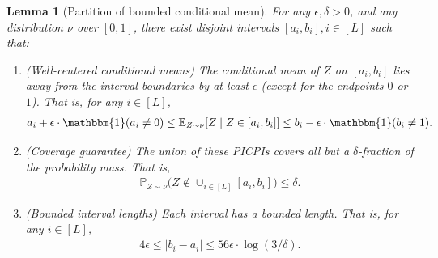\documentclass[11pt]{article}
\theoremstyle{statplain}
\newtheorem{lemma}[theorem]{Lemma}
\theoremstyle{statdefinition}
\newenvironment{proofsketch}
  {\begin{proof}[Proof sketch]\renewcommand{\qedsymbol}{}}
  {\end{proof}}
\newcommand{\E}{\mathbb{E}}
\newcommand{\PP}{\mathbb{P}}
\newcommand{\0}{\mathbf{0}}
\newcommand{\titleShorts}{PICPIs\xspace}
\begin{document}
    
\begin{lemma}[Partition of bounded conditional mean]\label{lem:dist-regularity}
For any $\epsilon, \delta > 0$, and any distribution $\nu$ over $[0,1]$, there exist disjoint intervals $[a_i,b_i], i \in [L]$ such that:
\begin{enumerate}
    \item \emph{(Well-centered conditional means)}  
    The conditional mean of $Z$ on $[a_i,b_i]$ lies away from the interval boundaries by at least $\epsilon$ (except for the endpoints $0$ or $1$). That is, for any $i \in [L]$, 
    \begin{align}\label{eq:regular-condition}
        a_i + \epsilon \cdot \mathbbm{1}(a_i \neq 0) \leq \E_{Z \sim \nu}[Z \mid Z \in [a_i,b_i]] \leq b_i - \epsilon \cdot \mathbbm{1}(b_i \neq 1).
    \end{align}
    \item 
    \emph{(Coverage guarantee)}  
    The union of these \titleShorts covers all but a $\delta$-fraction of the probability mass. That is, \begin{align}\label{eq:regular-condition-coverage}
        \PP_{Z \sim \nu}\Big(Z \notin \cup_{i \in [L]} [a_i,b_i]\Big) \leq \delta.
    \end{align}
    \item \emph{(Bounded interval lengths)}  
    Each interval has a bounded length. That is, for any $i \in [L]$,
    \begin{align}\label{eq:regular-condition-length}
        4\epsilon \leq \Big|b_i - a_i\Big| \leq 56 \epsilon \cdot \log(3/\delta).
    \end{align} %
\end{enumerate}
\end{lemma}


\end{document}

